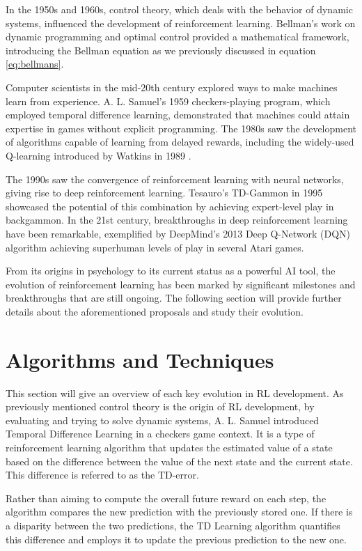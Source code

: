 In the 1950s and 1960s, control theory, which deals with the behavior of dynamic systems, influenced the development of reinforcement learning. Bellman's work on dynamic programming and optimal control provided a mathematical framework, introducing the Bellman equation as we previously discussed in equation \ref{eq:bellmans}.

Computer scientists in the mid-20th century explored ways to make machines learn from experience. A. L. Samuel's 1959 checkers-playing program, which employed temporal difference learning\cite{samuel2000some}, demonstrated that machines could attain expertise in games without explicit programming. The 1980s saw the development of algorithms capable of learning from delayed rewards, including the widely-used Q-learning introduced by Watkins in 1989 \cite{watkins1992q}.

The 1990s saw the convergence of reinforcement learning with neural networks, giving rise to deep reinforcement learning. Tesauro's TD-Gammon in 1995 showcased the potential of this combination by achieving expert-level play in backgammon\cite{tesauro1995temporal}. In the 21st century, breakthroughs in deep reinforcement learning have been remarkable, exemplified by DeepMind's 2013 Deep Q-Network (DQN) algorithm\cite{mnih2013playing} achieving superhuman levels of play in several Atari games.

From its origins in psychology to its current status as a powerful AI tool, the evolution of reinforcement learning has been marked by significant milestones and breakthroughs that are still ongoing. The following section will provide further details about the aforementioned proposals and study their evolution.

\section{Algorithms and Techniques}\label{sec:rl-algorithms_and_techniques}
This section will give an overview of each key evolution in RL development. As previously mentioned control theory is the origin of RL development, by evaluating and trying to solve dynamic systems, A. L. Samuel introduced Temporal Difference Learning \cite{samuel1959checkers} in a checkers game context. It is a type of reinforcement learning algorithm that updates the estimated value of a state based on the difference between the value of the next state and the current state. This difference is referred to as the TD-error.

Rather than aiming to compute the overall future reward on each step, the algorithm compares the new prediction with the previously stored one. If there is a disparity between the two predictions, the TD Learning algorithm quantifies this difference and employs it to update the previous prediction to the new one.


